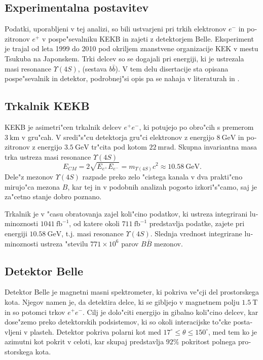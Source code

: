 \documentclass[headings=standardclasses,headings=big,oneside,a4paper,openany,12pt]{scrbook}
\newcommand {\e}[1]{\mathrm{~#1}}
\newcommand {\E}[1]{\times 10^{#1}}
\begin{document}
\begin{otherlanguage}{slovene}
\section{Experimentalna postavitev}

Podatki, uporabljeni v tej analizi, so bili ustvarjeni pri trkih elektronov $e^-$ in pozitronov $e^+$ v pospe"sevalniku KEKB in zajeti z detektorjem Belle. Eksperiment je trajal od leta 1999 do 2010 pod okriljem znanstvene organizacije KEK v mestu Tsukuba na Japonskem. Trki delcev so se dogajali pri energiji, ki je ustrezala masi resonance $\Upsilon(4S)$, (sestava $b \bar b$). V tem delu disertacije sta opisana pospe"sevalnik in detektor, podrobnej"si opis pa se nahaja v literaturah \cite{doi:10.1093/ptep/pts102} in \cite{ABASHIAN2002117}.

\subsection{Trkalnik KEKB}

KEKB je asimetri"cen trkalnik delcev $e^+e^-$, ki potujejo po obro"cih s premerom $3\e{km}$ v gru"cah. V sredi"s"cu detektorja gru"ci elektronov z energijo $8\e{GeV}$ in pozitronov z energijo $3.5\e{GeV}$ tr"cita pod kotom $22\e{mrad}$. Skupna invariantna masa trka ustreza masi resonance $\Upsilon(4S)$ 
\begin{equation}
E_{CM} = 2\sqrt{E_{e^+}E_{e^-}} = m_{\Upsilon(4S)}c^2 \approx 10.58\e{GeV}.
\end{equation}
Dele"z mezonov $\Upsilon(4S)$ razpade preko zelo "cistega kanala v dva prakti"cno mirujo"ca mezona $B$, kar tej in v podobnih analizah pogosto izkori"s"camo, saj je za"cetno stanje dobro poznano.

Trkalnik je v "casu obratovanja zajel koli"cino podatkov, ki ustreza integrirani luminoznosti $1041\e{fb^{-1}}$, od katere okoli $711\e{fb^{-1}}$ predstavlja podatke, zajete pri energiji $10.58\e{GeV}$, t.j. masi resonance $\Upsilon(4S)$. Slednja vrednost integrirane luminoznosti ustreza "stevilu $771\E{6}$ parov $B \bar B$ mezonov.

\subsection{Detektor Belle}
Detektor Belle je magnetni masni spektrometer, ki pokriva ve"cji del prostorskega kota. Njegov namen je, da detektira delce, ki se gibljejo v magnetnem polju $1.5\e{T}$ in so potomci trkov $e^+e^-$. Cilj je dolo"citi energijo in gibalno koli"cino delcev, kar dose"zemo preko detektorskih podsistemov, ki so okoli interacijske to"cke postavljeni v plasteh. Detektor pokriva polarni kot med $17^\circ \leq \theta \leq 150^\circ$, med tem ko je azimutni kot pokrit v celoti, kar skupaj predstavlja $92\%$ pokritost polnega prostorskega kota.

\end{otherlanguage}
\end{document}
